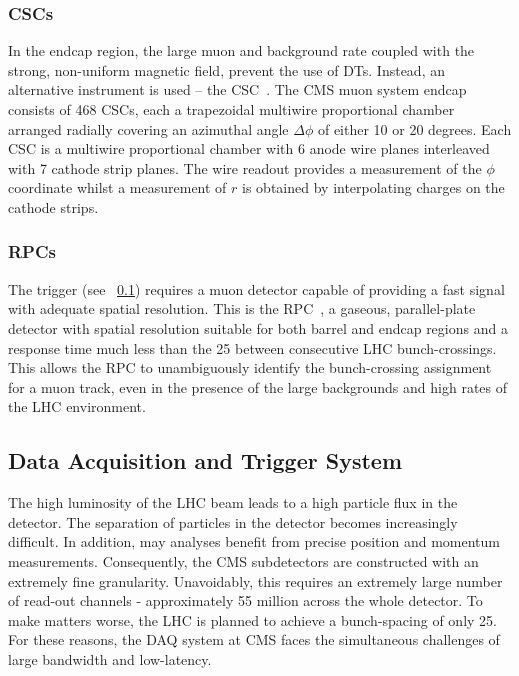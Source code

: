 \subsubsection{\aclp{CSC}}
In the endcap region, the large muon and background rate coupled with the
strong, non-uniform magnetic field, prevent the use of \acp{DT}. Instead, an
alternative instrument is used -- the \ac{CSC}~\cite{csc_paper}. The CMS muon
system endcap consists of 468 \acp{CSC}, each a trapezoidal multiwire
proportional chamber arranged radially covering an azimuthal angle $\Delta\phi$
of either 10 or 20 degrees. Each \ac{CSC} is a multiwire proportional chamber
with 6 anode wire planes interleaved with 7 cathode strip planes. The wire
readout provides a measurement of the $\phi$ coordinate whilst a measurement of
$r$ is obtained by interpolating charges on the cathode strips.

\subsubsection{\aclp{RPC}}
The trigger (see \sec~\ref{sec:trigger}) requires a muon detector capable of
providing a fast signal with adequate spatial resolution. This is the
\acf{RPC}~\cite{rpc_paper}, a gaseous, parallel-plate detector with spatial
resolution suitable for both barrel and endcap regions and a response time much
less than the \unit{25}{\nano\second} between consecutive \ac{LHC}
bunch-crossings. This allows the \ac{RPC} to unambiguously identify the
bunch-crossing assignment for a muon track, even in the presence of the large
backgrounds and high rates of the \ac{LHC} environment.

\subsection{Data Acquisition and Trigger System}
\label{sec:trigger}
The high luminosity of the \ac{LHC} beam leads to a high particle flux in the
detector. The separation of particles in the detector becomes increasingly
difficult. In addition, may analyses benefit from precise position and momentum
measurements. Consequently, the \ac{CMS} subdetectors are constructed with an
extremely fine granularity. Unavoidably, this requires an extremely large number
of read-out channels - approximately 55 million across the whole detector. To
make matters worse, the \ac{LHC} is planned to achieve a bunch-spacing of only
\unit{25}{\nano\second}. For these reasons, the \ac{DAQ} system at \ac{CMS}
faces the simultaneous challenges of large bandwidth and low-latency.

